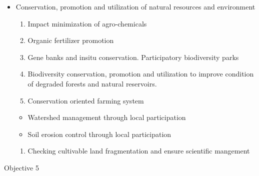 \documentclass[
]{book}
\providecommand{\tightlist}{%
  \setlength{\itemsep}{0pt}\setlength{\parskip}{0pt}}
\begin{document}
\begin{itemize}
\tightlist
\item
  Conservation, promotion and utilization of natural resources and environment

  \begin{enumerate}
  \def\labelenumi{\arabic{enumi}.}
  \tightlist
  \item
    Impact minimization of agro-chemicals
  \item
    Organic fertilizer promotion
  \item
    Gene banks and insitu conservation. Participatory biodiversity parks
  \item
    Biodiversity conservation, promotion and utilization to improve condition of degraded forests and natural reservoirs.
  \item
    Conservation oriented farming system
  \end{enumerate}

  \begin{itemize}
  \tightlist
  \item
    Watershed management through local participation
  \item
    Soil erosion control through local participation
  \end{itemize}

  \begin{enumerate}
  \def\labelenumi{\arabic{enumi}.}
  \setcounter{enumi}{5}
  \tightlist
  \item
    Checking cultivable land fragmentation and ensure scientific mangement
  \end{enumerate}
\end{itemize}

Objective 5
\end{document}
